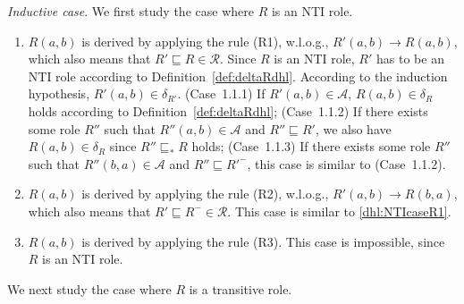 \emph{Inductive case}. We first study the case where $R$ is an NTI role.

\begin{enumerate}[leftmargin=12ex,label=Case~1.\arabic*, ref=Case~1.\arabic*]
\item $R(a,b)$ is derived by applying the rule (R1), w.l.o.g., $R'(a,b)\rightarrow R(a,b)$,
    which also means that $R'\sqsubseteq R\in\mathcal{R}$. Since $R$ is an NTI role, $R'$ has to
    be an NTI role according to Definition~\ref{def:deltaRdhl}. According to the induction hypothesis,
    $R'(a,b)\in\delta_{R'}$. (Case~1.1.1) If $R'(a,b)\in\mathcal{A}$, $R(a,b)\in\delta_{R}$
    holds according to Definition~\ref{def:deltaRdhl}; (Case~1.1.2) If there exists some
    role $R''$ such that $R''(a,b)\in\mathcal{A}$ and $R''\sqsubseteq R'$, we also have
    $R(a,b)\in\delta_{R}$ since $R''\sqsubseteq_* R$ holds; (Case~1.1.3) If there exists some
    role $R''$ such that $R''(b,a)\in\mathcal{A}$ and $R''\sqsubseteq R'^-$, this case is
    similar to (Case~1.1.2).\label{dhl:NTIcaseR1}

\item $R(a,b)$ is derived by applying the rule (R2), w.l.o.g., $R'(a,b)\rightarrow R(b,a)$,
    which also means that $R'\sqsubseteq R^-\in\mathcal{R}$. This case is similar
    to \ref{dhl:NTIcaseR1}.\label{dhl:NTIcaseR2}

\item $R(a,b)$ is derived by applying the rule (R3). This case is impossible, since $R$ is
    an NTI role.
\end{enumerate}

We next study the case where $R$ is a transitive role.

